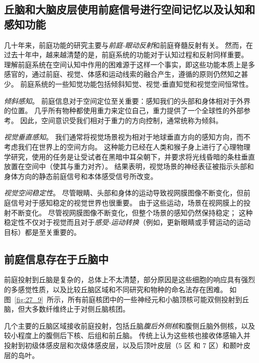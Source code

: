 \subsection{丘脑和大脑皮层使用前庭信号进行空间记忆以及认知和感知功能}

几十年来，前庭功能的研究主要与\textit{前庭-眼动反射}和前庭脊髓反射有关。
然而，在过去十年中，越来越清楚的是，前庭系统的功能对于认知过程和反射同样重要。
理解前庭系统在空间认知中作用的困难源于这样一个事实，即这些功能本质上是多感官的，通过前庭、视觉、体感和运动线索的融合产生，遵循的原则仍然知之甚少。
前庭系统的一些知觉功能包括倾斜知觉、视觉-垂直知觉和视觉空间恒常性。


\textit{倾斜感知}。
前庭信息对于空间定位至关重要：感知我们的头部和身体相对于外界的位置。
几乎所有物种都使用重力来定位自己，重力提供了一个全球性的外部参考。
因此，空间意识受我们相对于重力的方向控制，通常统称为倾斜。


\textit{视觉垂直感知}。
我们通常将视觉场景视为相对于地球垂直方向的感知方向，而不考虑我们在世界上的空间方向。
这种能力已经在人类和猴子身上进行了心理物理学研究，使用的任务是让受试者在黑暗中耳朵朝下，并要求将光线昏暗的条柱垂直放置在空间中（使其与重力对齐）。
结果表明，视觉场景的神经表征被指示头部和身体方向的静态前庭信号和本体感受信号所改变。


\textit{视觉空间稳定性}。
尽管眼睛、头部和身体的运动导致视网膜图像不断变化，但前庭信号对于感知稳定的视觉世界也很重要。
由于这些运动，场景在视网膜上的投射不断变化。
尽管视网膜图像不断变化，但整个场景的感知仍然保持稳定；
这种稳定性不仅对于视觉而且对于\textit{感受-运动转换}（例如，更新眼睛或手臂运动的运动目标）都是至关重要的。



\subsection{前庭信息存在于丘脑中}

前庭投射到丘脑是复杂的，总体上不太清楚，部分原因是这些细胞的响应具有强烈的多感觉性质，以及比较丘脑区域和不同研究和物种的命名法存在困难。
如图~\ref{fig:27_9}~所示，所有前庭核团中的一些神经元和小脑顶核可能双侧投射到丘脑，但大多数纤维终止于对侧丘脑核团。


几个主要的丘脑区域接收前庭投射，包括丘脑\textit{腹后外侧核}和腹侧丘脑外侧核，以及较小程度上的腹侧后下核、后组和前丘脑。
传统上认为这些核也接收体感输入并投射到初级体感皮层和次级体感皮层，以及后顶叶皮层（5 区 和 7 区）和颞叶皮层的岛叶。



